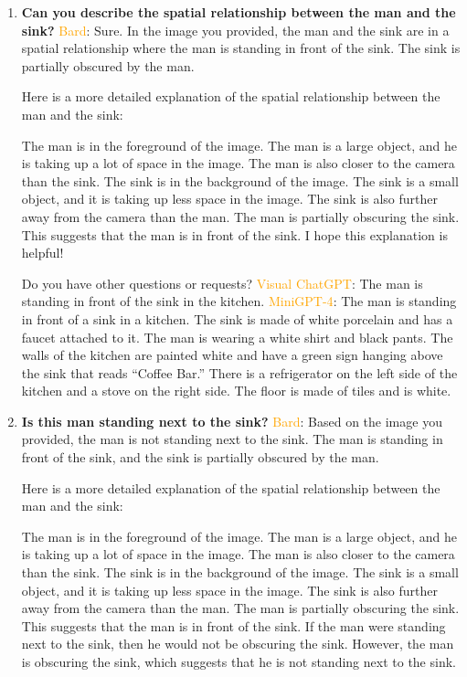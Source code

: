 \begin{enumerate}
    \item \textbf{Can you describe the spatial relationship between the man and the sink?}
    \subitem \textcolor{orange}{Bard}: 
    Sure. In the image you provided, the man and the sink are in a spatial relationship where the man is standing in front of the sink. The sink is partially obscured by the man.
    
    Here is a more detailed explanation of the spatial relationship between the man and the sink:
    
    The man is in the foreground of the image. The man is a large object, and he is taking up a lot of space in the image. The man is also closer to the camera than the sink.
    The sink is in the background of the image. The sink is a small object, and it is taking up less space in the image. The sink is also further away from the camera than the man.
    The man is partially obscuring the sink. This suggests that the man is in front of the sink.
    I hope this explanation is helpful!
    
    Do you have other questions or requests?
    \subitem \textcolor{orange}{Visual ChatGPT}: The man is standing in front of the sink in the kitchen.
    \subitem \textcolor{orange}{MiniGPT-4}: The man is standing in front of a sink in a kitchen. The sink is made of white porcelain and has a faucet attached to it. The man is wearing a white shirt and black pants. The walls of the kitchen are painted white and have a green sign hanging above the sink that reads “Coffee Bar.” There is a refrigerator on the left side of the kitchen and a stove on the right side. The floor is made of tiles and is white.
    \item \textbf{Is this man standing next to the sink?}
    \subitem \textcolor{orange}{Bard}: 
    Based on the image you provided, the man is not standing next to the sink. The man is standing in front of the sink, and the sink is partially obscured by the man.
    
    Here is a more detailed explanation of the spatial relationship between the man and the sink:
    
    The man is in the foreground of the image. The man is a large object, and he is taking up a lot of space in the image. The man is also closer to the camera than the sink.
    The sink is in the background of the image. The sink is a small object, and it is taking up less space in the image. The sink is also further away from the camera than the man.
    The man is partially obscuring the sink. This suggests that the man is in front of the sink.
    If the man were standing next to the sink, then he would not be obscuring the sink. However, the man is obscuring the sink, which suggests that he is not standing next to the sink.
    

\end{enumerate}
